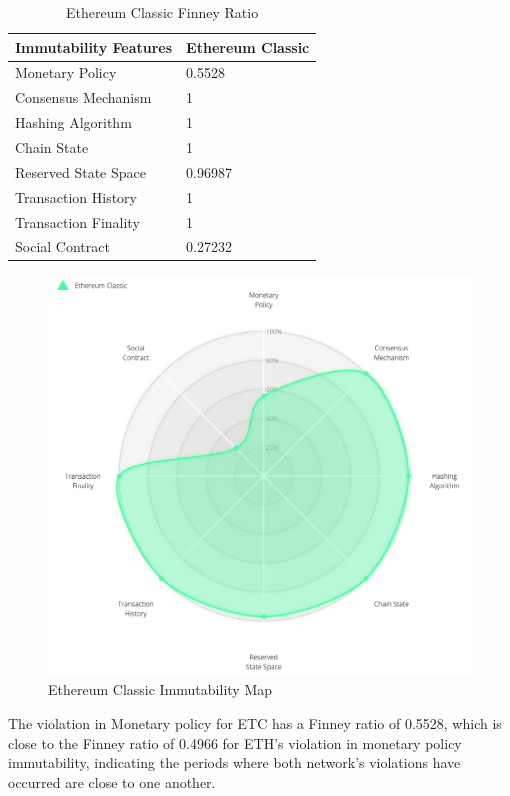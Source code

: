 \documentclass{article}
\begin{document}
\begin{table}
 \caption{Ethereum Classic Finney Ratio}
  \centering
  \begin{tabular}{ll}
    \toprule
    \cmidrule(r){1-2}
    Immutability Features & Ethereum Classic \\
    \midrule
    Monetary Policy & 0.5528     \\
    Consensus Mechanism & 1     \\
    Hashing Algorithm & 1     \\
    Chain State & 1     \\
    Reserved State Space & 0.96987     \\
    Transaction History & 1     \\
    Transaction Finality & 1     \\
    Social Contract & 0.27232     \\
    \bottomrule
  \end{tabular}
  \label{tab4:table}
\end{table}

\begin{figure}
  \centering
  \includegraphics[width=12cm]{etc.png}
  \caption{Ethereum Classic Immutability Map}
  \label{fig:fig2}
\end{figure}

The violation in Monetary policy for ETC has a Finney ratio of 0.5528, which is close to the Finney ratio of 0.4966 for ETH’s violation in monetary policy immutability, indicating the periods where both network's violations have occurred are close to one another.
\end{document}
